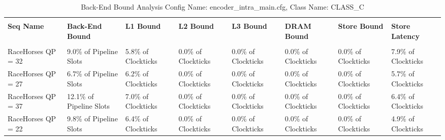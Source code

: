 \documentclass{article}%
\begin{document}
\newpage%
\begin{longtabu}{| X[l] | X[l] | X[l] | X[l] | X[l] | X[l] | X[l] | X[l] |}%
\caption{%
Back{-}End Bound Analysis\newline%
 Config Name: encoder\_intra\_main.cfg,\newline%
 Class Name: CLASS\_C\newline%
%
}%
\hline%
&&&&&&&\\%
\textbf{Seq Name}&\textbf{Back{-}End Bound}&\textbf{L1 Bound}&\textbf{L2 Bound}&\textbf{L3 Bound}&\textbf{DRAM Bound}&\textbf{Store Bound}&\textbf{Store Latency}\\%
&&&&&&&\\%
\hline%
\endhead%
RaceHorses\newline%
 QP = 32&9.0\% of Pipeline Slots&5.8\% of Clockticks&0.0\% of Clockticks&0.0\% of Clockticks&0.0\% of Clockticks&0.0\% of Clockticks&7.9\% of Clockticks\\%
\hline%
RaceHorses\newline%
 QP = 27&6.7\% of Pipeline Slots&6.2\% of Clockticks&0.0\% of Clockticks&0.0\% of Clockticks&0.0\% of Clockticks&0.0\% of Clockticks&5.7\% of Clockticks\\%
\hline%
RaceHorses\newline%
 QP = 37&12.1\% of Pipeline Slots&7.0\% of Clockticks&0.0\% of Clockticks&0.0\% of Clockticks&0.0\% of Clockticks&0.0\% of Clockticks&6.4\% of Clockticks\\%
\hline%
RaceHorses\newline%
 QP = 22&9.8\% of Pipeline Slots&6.4\% of Clockticks&0.0\% of Clockticks&0.0\% of Clockticks&0.0\% of Clockticks&0.0\% of Clockticks&4.9\% of Clockticks\\%
\hline%
\end{longtabu}%
\newpage

%
\end{document}
